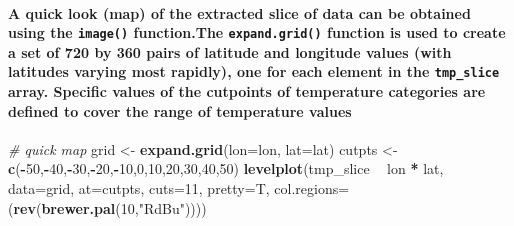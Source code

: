 \documentclass[]{article}
\newenvironment{Shaded}{\begin{snugshade}}{\end{snugshade}}
\newcommand{\KeywordTok}[1]{\textcolor[rgb]{0.13,0.29,0.53}{\textbf{#1}}}
\newcommand{\DataTypeTok}[1]{\textcolor[rgb]{0.13,0.29,0.53}{#1}}
\newcommand{\DecValTok}[1]{\textcolor[rgb]{0.00,0.00,0.81}{#1}}
\newcommand{\StringTok}[1]{\textcolor[rgb]{0.31,0.60,0.02}{#1}}
\newcommand{\CommentTok}[1]{\textcolor[rgb]{0.56,0.35,0.01}{\textit{#1}}}
\newcommand{\OperatorTok}[1]{\textcolor[rgb]{0.81,0.36,0.00}{\textbf{#1}}}
\newcommand{\NormalTok}[1]{#1}
\let\oldparagraph\paragraph
\renewcommand{\paragraph}[1]{\oldparagraph{#1}\mbox{}}
\begin{document}
\paragraph{\texorpdfstring{A quick look (map) of the extracted slice of
data can be obtained using the \texttt{image()} function.The
\texttt{expand.grid()} function is used to create a set of 720 by 360
pairs of latitude and longitude values (with latitudes varying most
rapidly), one for each element in the \texttt{tmp\_slice} array.
Specific values of the cutpoints of temperature categories are defined
to cover the range of temperature
values}{A quick look (map) of the extracted slice of data can be obtained using the image() function.The expand.grid() function is used to create a set of 720 by 360 pairs of latitude and longitude values (with latitudes varying most rapidly), one for each element in the tmp\_slice array. Specific values of the cutpoints of temperature categories are defined to cover the range of temperature values}}\label{a-quick-look-map-of-the-extracted-slice-of-data-can-be-obtained-using-the-image-function.the-expand.grid-function-is-used-to-create-a-set-of-720-by-360-pairs-of-latitude-and-longitude-values-with-latitudes-varying-most-rapidly-one-for-each-element-in-the-tmp_slice-array.-specific-values-of-the-cutpoints-of-temperature-categories-are-defined-to-cover-the-range-of-temperature-values}

\begin{Shaded}
\begin{Highlighting}[]
\CommentTok{# quick map}
\NormalTok{grid <-}\StringTok{ }\KeywordTok{expand.grid}\NormalTok{(}\DataTypeTok{lon=}\NormalTok{lon, }\DataTypeTok{lat=}\NormalTok{lat)}
\NormalTok{cutpts <-}\StringTok{ }\KeywordTok{c}\NormalTok{(}\OperatorTok{-}\DecValTok{50}\NormalTok{,}\OperatorTok{-}\DecValTok{40}\NormalTok{,}\OperatorTok{-}\DecValTok{30}\NormalTok{,}\OperatorTok{-}\DecValTok{20}\NormalTok{,}\OperatorTok{-}\DecValTok{10}\NormalTok{,}\DecValTok{0}\NormalTok{,}\DecValTok{10}\NormalTok{,}\DecValTok{20}\NormalTok{,}\DecValTok{30}\NormalTok{,}\DecValTok{40}\NormalTok{,}\DecValTok{50}\NormalTok{)}
\KeywordTok{levelplot}\NormalTok{(tmp_slice }\OperatorTok{~}\StringTok{ }\NormalTok{lon }\OperatorTok{*}\StringTok{ }\NormalTok{lat, }\DataTypeTok{data=}\NormalTok{grid, }\DataTypeTok{at=}\NormalTok{cutpts, }\DataTypeTok{cuts=}\DecValTok{11}\NormalTok{, }\DataTypeTok{pretty=}\NormalTok{T, }
\DataTypeTok{col.regions=}\NormalTok{(}\KeywordTok{rev}\NormalTok{(}\KeywordTok{brewer.pal}\NormalTok{(}\DecValTok{10}\NormalTok{,}\StringTok{"RdBu"}\NormalTok{))))}
\end{Highlighting}
\end{Shaded}
\end{document}
